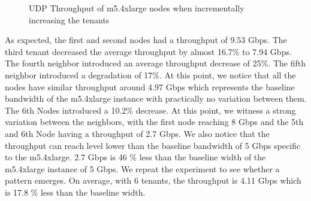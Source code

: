 \begin{figure}[H]
\centering
{}
\caption{UDP Throughput of m5.4xlarge nodes when incrementally increasing the tenants}
\end{figure}

\noindent
As expected, the first and second nodes had a throughput of 9.53 Gbps. 
The third tenant decreased the average throughput by almost 16.7\% to 7.94 Gbps. The fourth neighbor introduced 
an average throughput decrease of 25\%. The fifth neighbor introduced a degradation of 17\%. At this point, 
we notice that all the nodes have similar throughput around 4.97 Gbps which represents the baseline bandwidth
of the m5.4xlarge instance with practically no variation between them. The 6th Nodes introduced a 10.2\% 
decrease. At this point, we witness a strong variation between the neighbors, with the first node reaching 
8 Gbps and the 5th and 6th Node having a throughput of 2.7 Gbps. We also notice that the throughput can reach level lower than the baseline bandwidth of 5 Gbps 
specific to the m5.4xlarge. 2.7 Gbps is 46 \% less than the baseline width of the m5.4xlarge instance of 5 Gbps.
We repeat the experiment to see whether a pattern emerges. On average, with 6 tenants, the throughput is 
4.11 Gbps which is 17.8 \% less than the baseline width. 

